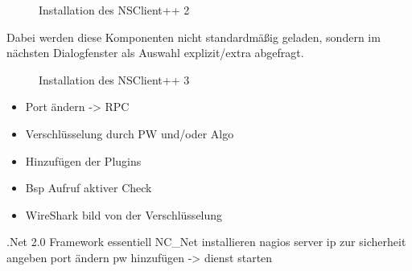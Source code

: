 \begin{figure}[ht]
	\centering
		\caption{Installation des NSClient++ 2}
		\label{nscs2}
\end{figure}
Dabei werden diese Komponenten nicht standardmäßig geladen, sondern im nächsten Dialogfenster als Auswahl explizit/extra abgefragt.


\begin{figure}[ht]
	\centering
		\caption{Installation des NSClient++ 3}
		\label{nscs3}
\end{figure}




\begin{itemize}
\item Port ändern -> RPC
\item Verschlüsselung durch PW und/oder Algo
\item Hinzufügen der Plugins
\item Bsp Aufruf aktiver Check
\item WireShark bild von der Verschlüsselung
\end{itemize}

.Net 2.0 Framework essentiell
NC\_Net installieren
nagios server ip zur sicherheit angeben
port ändern
pw hinzufügen
-> dienst starten

